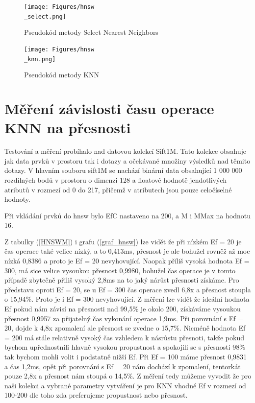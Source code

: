 \documentclass[czech,semestral,dept460,male,csharp,cpdeclaration]{diploma}
\begin{document}
		\begin{figure}
			\centering
			\texttt{[image: Figures/hnsw\\\_select.png]}
			\caption{Pseudokód metody Select Nearest Neighbors}
			\label{hnsw_select}
		\end{figure}
		
		\begin{figure}
			\centering
			\texttt{[image: Figures/hnsw\\\_knn.png]}
			\caption{Pseudokód metody KNN}
			\label{hnsw_knn}
		\end{figure}
		
		\newpage
		
		\section{Měření závislosti času operace KNN na přesnosti}
		
		Testování a měření probíhalo nad datovou kolekcí Sift1M. Tato kolekce obsahuje jak data prvků v prostoru tak i dotazy a očekávané množiny výsledků nad těmito dotazy. V hlavním souboru sift1M se nachází binární data obsahující 1 000 000 rozdílných bodů v prostoru o dimenzi 128 a floatové hodnotě jendotlivých atributů v rozmezí od 0 do 217, přičemž v atributech jsou pouze celočíselné hodnoty.
		
		Při vkládání prvků do hnsw bylo EfC nastaveno na 200, a M i MMax na hodnotu 16.
		
		Z tabulky (\ref{HNSWM}) i grafu (\ref{graf_hnsw}) lze vidět že při nízkém Ef = 20 je čas operace také velice nízký, a to 0,413ms, přesnost je ale bohužel rovněž až moc nízká 0,8386 a proto je Ef = 20 nevyhovující. Naopak příliš vysoká hodnota Ef = 300, má sice velice vysoukou přesnost 0,9980, bohužel čas operace je v tomto případě zbytečně přiliš vysoký 2,8ms na to jaký nárůst přesnosti získáme. Pro představu oproti Ef = 20, se u Ef = 300 čas operace zvedl 6,8x a přesnost stoupla o 15,94\%. Proto je i Ef = 300 nevyhovující. Z měření lze vidět že ideální hodnota Ef pokud nám závisí na přesnosti nad 99,5\% je okolo 200, získáváme vysoukou přesnost 0,9957 za přijatelný čas vykonání operace 1,9ms. Při porovnání s Ef = 20, dojde k 4,8x zpomalení ale přesnost se zvedne o 15,7\%. Nicméně hodnota Ef = 200 má stále relativně vysoký čas vzhledem k násrůstu přesnoti, takže pokud bychom upřednostnili hlavně vysokou propustnost a spokojili se s přesností 98\% tak bychom mohli volit i podstatně nižší Ef. Při Ef = 100 máme přesnost 0,9831 a čas 1,2ms, opět při porovnání s Ef = 20 nám dochází k zpomalení, tentorkát pouze 2,8x a přesnost nám stoupá o 14,5\%. Z měření tedy můžeme vyvodit že pro naši kolekci a vybrané parametry vytváření je pro KNN vhodné Ef v rozmezí od 100-200 dle toho zda preferujeme propustnost nebo přesnost.
		
\end{document}
